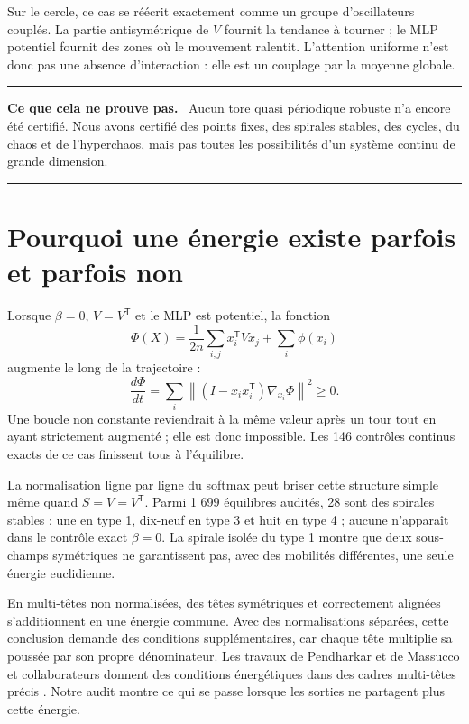 \documentclass[11pt,a4paper]{article}
\theoremstyle{definition}
\newcommand{\T}{\mathsf T}
\newcommand{\norm}[1]{\left\lVert #1\right\rVert}
\newenvironment{limitbox}
{\begin{center}\begin{minipage}{0.92\textwidth}\color{deeporange}\hrule\vspace{0.45em}\small\textbf{Ce que cela ne prouve pas.}\ \color{black}}
{\vspace{0.35em}\color{deeporange}\hrule\color{black}\end{minipage}\end{center}}
\begin{document}
Sur le cercle, ce cas se réécrit exactement comme un groupe d'oscillateurs couplés. La
partie antisymétrique de $V$ fournit la tendance à tourner ; le MLP potentiel fournit
des zones où le mouvement ralentit. L'attention uniforme n'est donc pas une absence
d'interaction : elle est un couplage par la moyenne globale.

\begin{limitbox}
Aucun tore quasi périodique robuste n'a encore été certifié. Nous avons certifié des
points fixes, des spirales stables, des cycles, du chaos et de l'hyperchaos, mais pas
toutes les possibilités d'un système continu de grande dimension.
\end{limitbox}

\section{Pourquoi une énergie existe parfois et parfois non}
\label{sec:energy}

Lorsque $\beta=0$, $V=V^{\T}$ et le MLP est potentiel, la fonction
\begin{equation}
 \Phi(X)=\frac{1}{2n}\sum_{i,j}x_i^{\T}Vx_j+\sum_i\phi(x_i)\label{eq:global-potential}
\end{equation}
augmente le long de la trajectoire :
\[
 \frac{d\Phi}{dt}=\sum_i\norm{(I-x_ix_i^{\T})\nabla_{x_i}\Phi}^2\ge0.
\]
Une boucle non constante reviendrait à la même valeur après un tour tout en ayant
strictement augmenté ; elle est donc impossible. Les 146 contrôles continus exacts de
ce cas finissent tous à l'équilibre.

La normalisation ligne par ligne du softmax peut briser cette structure simple même
quand $S=V=V^{\T}$. Parmi 1 699 équilibres audités, 28 sont des spirales stables : une
en type 1, dix-neuf en type 3 et huit en type 4 ; aucune n'apparaît dans le contrôle
exact $\beta=0$. La spirale isolée du type 1 montre que deux sous-champs symétriques ne
garantissent pas, avec des mobilités différentes, une seule énergie euclidienne.

En multi-têtes non normalisées, des têtes symétriques et correctement alignées
s'additionnent en une énergie commune. Avec des normalisations séparées, cette
conclusion demande des conditions supplémentaires, car chaque tête multiplie sa
poussée par son propre dénominateur. Les travaux de Pendharkar et de Massucco et
collaborateurs donnent des conditions énergétiques dans des cadres multi-têtes
précis \cite{pendharkar2026multihead,massucco2026time}. Notre audit montre ce qui se
passe lorsque les sorties ne partagent plus cette énergie.
\end{document}
